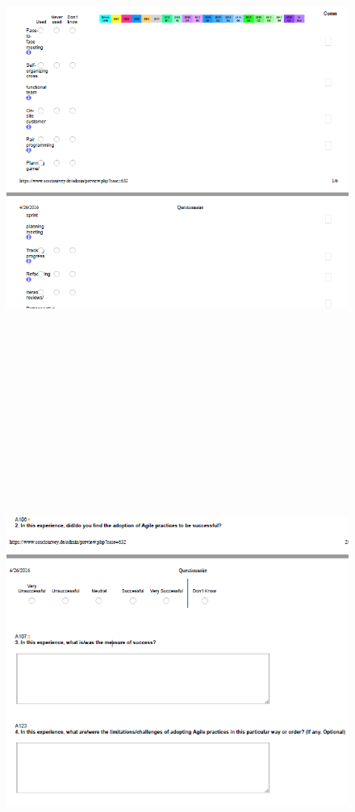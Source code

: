 \documentclass[a4paper,oneside]{bth}
\begin{document}
\begin{appendices}
\begin{figure}[h]
\includegraphics [width=14cm, height=16cm]{Screenshot_2.png}
\end{figure}
\begin{figure}[h]
\includegraphics[width=14cm, height=16cm]{Screenshot_3.png}

\end{figure}
\end{appendices}
\end{document}
